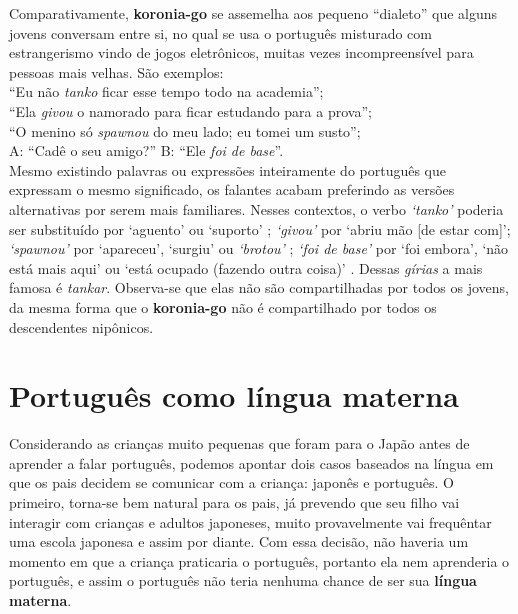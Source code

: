 \documentclass{article}
\newcommand{\keyword}[1]{\textbf{#1}}
\begin{document}

Comparativamente,
\keyword{koronia-go} se assemelha aos
pequeno ``dialeto'' que alguns jovens conversam entre si,
no qual se usa o português misturado
com estrangerismo vindo de jogos eletrônicos,
muitas vezes incompreensível para pessoas mais velhas.
São exemplos: \\
``Eu não \emph{tanko} ficar esse tempo todo na academia''; \\
``Ela \emph{givou} o namorado para ficar estudando para a prova''; \\
``O menino só \emph{spawnou} do meu lado; eu tomei um susto''; \\
A: ``Cadê o seu amigo?'' B: ``Ele \emph{foi de base}''. \\
Mesmo existindo palavras ou expressões inteiramente do português
que expressam o mesmo significado,
os falantes acabam preferindo as versões alternativas
por serem mais familiares.
Nesses contextos,
o verbo \emph{`tanko'} poderia ser substituído
por `aguento' ou `suporto'
\cite{tankaruol} \cite{tankarwikti};
\emph{`givou'} por `abriu mão [de estar com]';
\emph{`spawnou'} por `apareceu', `surgiu' ou \emph{`brotou'}
\cite{spawnardicioinf} \cite{spawnarwikti};
\emph{`foi de base'} por `foi embora',
`não está mais aqui' ou `está ocupado (fazendo outra coisa)'
\cite{irdebasehinative} \cite{irdebasewikti} \cite{irdebasedicioinf}.
Dessas \emph{gírias} a mais famosa é \emph{tankar}.
Observa-se que elas não são compartilhadas por todos os jovens,
da mesma forma que o \keyword{koronia-go} não
é compartilhado por todos os descendentes nipônicos.

\section{Português como língua materna}

Considerando as crianças muito pequenas
que foram para o Japão antes de aprender a falar português,
podemos apontar dois casos
baseados na língua em que
os pais decidem se comunicar com a criança:
japonês e português.
O primeiro, torna-se bem natural para os pais,
já prevendo que seu filho vai interagir com
crianças e adultos japoneses,
muito provavelmente vai frequêntar uma escola japonesa e
assim por diante.
Com essa decisão,
não haveria um momento em que a criança
praticaria o português,
portanto ela nem aprenderia o português,
e assim o português não teria nenhuma chance de
ser sua \keyword{língua materna}.
\end{document}
